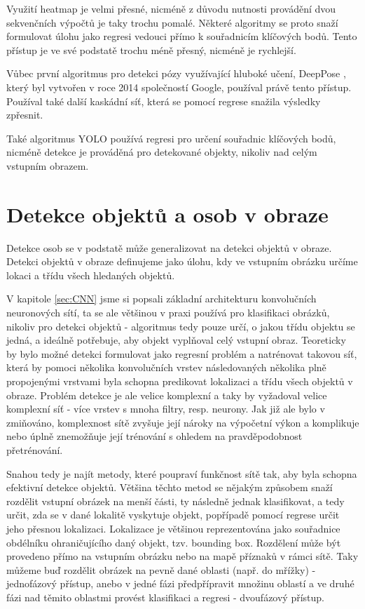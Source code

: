 Využití heatmap je velmi přesné, nicméně z důvodu nutnosti provádění dvou
sekvenčních výpočtů je taky trochu pomalé. Některé algoritmy se proto snaží
formulovat úlohu jako regresi vedouci přímo k souřadnicím klíčových bodů. Tento
přístup je ve své podstatě trochu méně přesný, nicméně je rychlejší.

Vůbec první algoritmus pro detekci pózy využívající hluboké učení, DeepPose \cite{deep-pose}, který byl
vytvořen v roce 2014 společností Google, používal právě tento přístup. Používal
také další kaskádní síť, která se pomocí regrese snažila výsledky zpřesnit. 

Také algoritmus YOLO používá regresi pro určení souřadnic klíčových bodů,
nicméně detekce je prováděná pro detekované objekty, nikoliv nad celým vstupním
obrazem. \cite{yolo-pose}


\section{Detekce objektů a osob v obraze}

Detekce osob se v podstatě může generalizovat na detekci objektů v obraze.
Detekci objektů v obraze definujeme jako úlohu, kdy ve vstupním obrázku určíme
lokaci a třídu všech hledaných objektů.

V kapitole \ref{sec:CNN} jsme si popsali základní architekturu konvolučních
neuronových sítí, ta se ale většinou v praxi používá pro klasifikaci obrázků,
nikoliv pro detekci objektů - algoritmus tedy pouze určí, o jakou třídu objektu
se jedná, a ideálně potřebuje, aby objekt vyplňoval celý vstupní obraz.
Teoreticky by bylo možné detekci formulovat jako regresní problém a natrénovat
takovou síť, která by pomoci několika konvolučních vrstev následovaných
několika plně propojenými vrstvami byla schopna predikovat lokalizaci a třídu
všech objektů v obraze. \cite{szegedy} Problém detekce je ale velice komplexní
a taky by vyžadoval velice komplexní síť - více vrstev s mnoha filtry, resp.
neurony. Jak již ale bylo v zmiňováno, komplexnost sítě zvyšuje její nároky na
výpočetní výkon a komplikuje nebo úplně znemožňuje její trénování s ohledem na
pravděpodobnost přetrénování.

Snahou tedy je najít metody, které poupraví funkčnost sítě tak, aby byla
schopna efektivní detekce objektů. Většina těchto metod se nějakým způsobem
snaží rozdělit vstupní obrázek na menší části, ty následně jednak klasifikovat,
a tedy určit, zda se v dané lokalitě vyskytuje objekt, popřípadě pomocí regrese
určit jeho přesnou lokalizaci. Lokalizace je většinou reprezentována jako
souřadnice obdélníku ohraničujícího daný objekt, tzv. bounding box. Rozdělení
může být provedeno přímo na vstupním obrázku nebo na mapě příznaků v rámci
sítě. Taky můžeme buď rozdělit obrázek na pevně dané oblasti (např. do mřížky)
- jednofázový přístup, anebo v jedné fázi předpřípravit množinu oblastí a ve
druhé fázi nad těmito oblastmi provést klasifikaci a regresi - dvoufázový
přístup.

